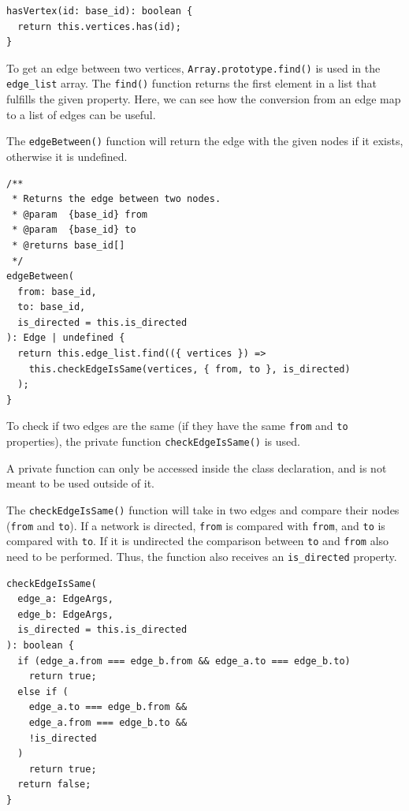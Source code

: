 \begin{verbatim}
hasVertex(id: base_id): boolean {
  return this.vertices.has(id);
}
\end{verbatim}

To get an edge between two vertices, \texttt{Array.prototype.find()}
is used in the \texttt{edge_list} array.
The \texttt{find()}
function returns the first element in a list that fulfills the given property.
Here, we can see how the conversion from an edge map to a list of edges
can be useful.

The \texttt{edgeBetween()} function will return the edge with the given nodes if it exists,
otherwise it is undefined.

\begin{verbatim}
/**
 * Returns the edge between two nodes.
 * @param  {base_id} from
 * @param  {base_id} to
 * @returns base_id[]
 */
edgeBetween(
  from: base_id,
  to: base_id,
  is_directed = this.is_directed
): Edge | undefined {
  return this.edge_list.find(({ vertices }) =>
    this.checkEdgeIsSame(vertices, { from, to }, is_directed)
  );
}
\end{verbatim}

To check if two edges are the same
(if they have the same \texttt{from} and \texttt{to} properties),
the private function \texttt{checkEdgeIsSame()} is used.

A private function can only be accessed inside the class declaration,
and is not meant to be used outside of it.

The \texttt{checkEdgeIsSame()} function will take in two edges and compare their nodes
(\texttt{from} and \texttt{to}).
If a network is directed, \texttt{from} is compared with \texttt{from},
and \texttt{to} is compared with \texttt{to}.
If it is undirected the comparison between \texttt{to} and \texttt{from}
also need to be performed.
Thus, the function also receives an \texttt{is_directed} property.

\begin{verbatim}
checkEdgeIsSame(
  edge_a: EdgeArgs,
  edge_b: EdgeArgs,
  is_directed = this.is_directed
): boolean {
  if (edge_a.from === edge_b.from && edge_a.to === edge_b.to)
    return true;
  else if (
    edge_a.to === edge_b.from &&
    edge_a.from === edge_b.to &&
    !is_directed
  )
    return true;
  return false;
}
\end{verbatim}


